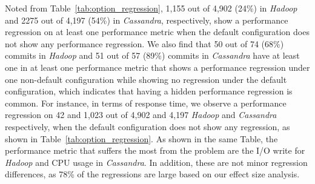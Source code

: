 Noted from Table~\ref{tab:option_regression}, 1,155 out of 4,902 (24\%) \instance in \emph{Hadoop} and 2275 out of 4,197 (54\%) \instance in \emph{Cassandra}, respectively, show a performance regression on at least one performance metric when the default configuration does not show any performance regression. %
We also find that 50 out of 74 (68\%) commits in \emph{Hadoop} and 51 out of 57 (89\%) commits in \emph{Cassandra} have at least one \instance in at least one performance metric that shows a performance regression under one non-default configuration while showing no regression under the default configuration, %
which indicates that having a hidden performance regression is common. %
For instance, in terms of response time, we observe a performance regression on 42 and 1,023 out of 4,902 and 4,197 \emph{Hadoop} and \emph{Cassandra} \instance %
respectively, when the default configuration does not show any regression, as shown in Table~\ref{tab:option_regression}. As shown in the same Table, the performance metric that suffers the most from the \inconsistent problem %
are the I/O write  for \emph{Hadoop} and CPU usage in \emph{Cassandra}. %
In addition, these are not minor regression differences, as 78\% of the regressions are large based on our effect size analysis. 


